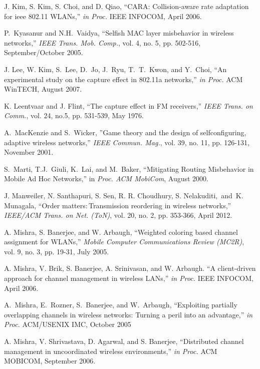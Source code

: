 \documentclass[10pt,journal,cspaper,compsoc]{IEEEtran}
\begin{document}
\begin{thebibliography}{1}
J. Kim, S. Kim, S. Choi, and D. Qiao,
``CARA: Collision-aware rate adaptation for ieee 802.11 WLANs,''
{\em in Proc. } IEEE INFOCOM, April 2006.


P.~Kyasanur and N.H.~Vaidya,
``Selfish MAC layer misbehavior in wireless networks,''
{\em IEEE Trans. Mob. Comp.}, vol. 4, no. 5, pp. 502-516, September/October 2005.

J. Lee, W. Kim, S.~Lee, D.~Jo, J.~Ryu, T.~T.~Kwon, and Y.~Choi,
``An experimental study on the capture effect in 802.11a networks,''
{\em in Proc. } ACM WinTECH, August 2007.

K. Leentvaar and J. Flint,
``The capture effect in FM receivers,''
{\em IEEE Trans. on Comm.}, vol. 24, no.5, pp. 531-539, May 1976.

A.~MacKenzie and S.~Wicker,
''Game theory and the design of selfconfiguring, adaptive wireless networks,''
{\em IEEE Commun. Mag.}, vol. 39, no. 11, pp. 126-131, November 2001.


S.~Marti, T.J.~Giuli, K.~Lai, and M.~Baker,
``Mitigating Routing Misbehavior in Mobile Ad Hoc Networks,''
in {\em Proc. ACM MobiCom}, August 2000.


J. Manweiler, N. Santhapuri, S. Sen, R. R. Choudhury, S. Nelakuditi,\, and\, K. Munagala,
``Order matters:\,Transmission reordering in wireless networks,''
{\em IEEE/ACM Trans. on Net. (ToN)}, vol. 20, no. 2, pp. 353-366, April 2012.

A. Mishra, S. Banerjee, and W. Arbaugh,
``Weighted coloring based channel assignment for WLANs,''
{\em Mobile Computer Communications Review (MC2R)}, vol. 9, no. 3, pp. 19-31, July 2005.

A. Mishra, V. Brik, S. Banerjee, A. Srinivasan, and W. Arbaugh.
``A client-driven approach for channel management in wireless LANs,''
{\em in Proc.} IEEE INFOCOM, April 2006.

A.~Mishra, E.~Rozner, S.~Banerjee, and W.~Arbaugh,
``Exploiting partially overlapping channels in wireless networks: Turning a peril into an advantage,''
{\em in Proc.} ACM/USENIX IMC, October 2005


A. Mishra, V. Shrivastava, D. Agarwal, and S. Banerjee,
``Distributed channel management in uncoordinated wireless environments,''
{\em in Proc.} ACM MOBICOM, September 2006.


\end{thebibliography}
\end{document}
